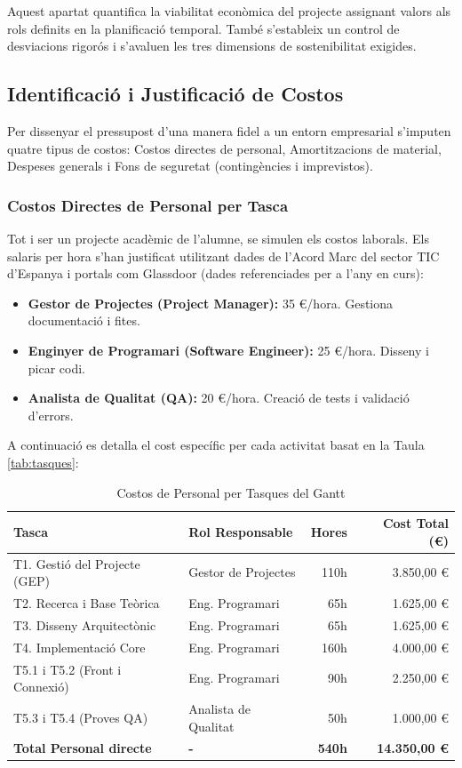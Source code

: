 Aquest apartat quantifica la viabilitat econòmica del projecte assignant valors als rols definits en la planificació temporal. També s'estableix un control de desviacions rigorós i s'avaluen les tres dimensions de sostenibilitat exigides.

\subsection{Identificació i Justificació de Costos}
Per dissenyar el pressupost d'una manera fidel a un entorn empresarial s'imputen quatre tipus de costos: Costos directes de personal, Amortitzacions de material, Despeses generals i Fons de seguretat (contingències i imprevistos).

\subsubsection{Costos Directes de Personal per Tasca}
Tot i ser un projecte acadèmic de l'alumne, se simulen els costos laborals. Els salaris per hora s'han justificat utilitzant dades de l'Acord Marc del sector TIC d'Espanya i portals com Glassdoor (dades referenciades per a l'any en curs):
\begin{itemize}
    \item \textbf{Gestor de Projectes (Project Manager):} 35 \euro/hora. Gestiona documentació i fites.
    \item \textbf{Enginyer de Programari (Software Engineer):} 25 \euro/hora. Disseny i picar codi.
    \item \textbf{Analista de Qualitat (QA):} 20 \euro/hora. Creació de tests i validació d'errors.
\end{itemize}

A continuació es detalla el cost específic per cada activitat basat en la Taula \ref{tab:tasques}:

\begin{table}[H]
\centering
\caption{Costos de Personal per Tasques del Gantt}
\begin{tabularx}{\textwidth}{@{}lXrr@{}}
\toprule
\textbf{Tasca} & \textbf{Rol Responsable} & \textbf{Hores} & \textbf{Cost Total (\euro)} \\ \midrule
T1. Gestió del Projecte (GEP) & Gestor de Projectes & 110h & 3.850,00 \euro \\
T2. Recerca i Base Teòrica & Eng. Programari & 65h & 1.625,00 \euro \\
T3. Disseny Arquitectònic & Eng. Programari & 65h & 1.625,00 \euro \\
T4. Implementació Core & Eng. Programari & 160h & 4.000,00 \euro \\
T5.1 i T5.2 (Front i Connexió) & Eng. Programari & 90h & 2.250,00 \euro \\
T5.3 i T5.4 (Proves QA) & Analista de Qualitat & 50h & 1.000,00 \euro \\ \midrule
\textbf{Total Personal directe} & \textbf{-} & \textbf{540h} & \textbf{14.350,00 \euro} \\
\bottomrule
\end{tabularx}
\end{table}

